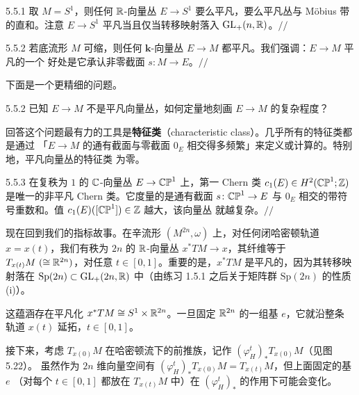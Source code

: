 \begin{wexam}{5.5.1}
  取 $M=S^1$，则任何 $\mathbb{R}$-向量丛 $E\to S^1$ 要么平凡，要么平凡丛与 Möbius 带的直和。注意
  $E\to S^1$ 平凡当且仅当转移映射落入 $\mathrm{GL}_+(n,\mathbb{R})$。\hfill$//$
\end{wexam}

\begin{wexam}{5.5.2}
  若底流形 $M$ 可缩，则任何 $\mathbf{k}$-向量丛 $E\to M$ 都平凡。我们强调：$E\to M$ 平凡的一个
  好处是它承认非零截面 $s\colon M\to E$。\hfill$//$
\end{wexam}

下面是一个更精细的问题。

\begin{wque}{5.5.2}
  已知 $E\to M$ 不是平凡向量丛，如何定量地刻画 $E\to M$ 的复杂程度？
\end{wque}

回答这个问题最有力的工具是\textbf{特征类}（characteristic class）。几乎所有的特征类都是通过
「$E\to M$ 的通有截面与零截面 $0_E$ 相交得多频繁」来定义或计算的。特别地，平凡向量丛的特征类
为零。

\begin{wexam}{5.5.3}
  在复秩为 $1$ 的 $\mathbb{C}$-向量丛 $E\to\mathbb{CP}^1$ 上，第一 Chern 类
  $c_1(E)\in H^2(\mathbb{CP}^1;\mathbb{Z})$ 是唯一的非平凡 Chern 类。它度量的是通有截面
  $s\colon\mathbb{CP}^1\to E$ 与 $0_E$ 相交的带符号重数和。值 $c_1(E)([\mathbb{CP}^1])\in\mathbb{Z}$ 越大，该向量丛
  就越复杂。\hfill$//$
\end{wexam}

现在回到我们的指标故事。在辛流形 $(M^{2n},\omega)$ 上，对任何闭哈密顿轨道 $x=x(t)$，我们有秩为
$2n$ 的 $\mathbb{R}$-向量丛 $x^*TM\to x$，其纤维等于 $T_{x(t)}M\ (\cong\mathbb{R}^{2n})$，对任意
$t\in[0,1]$。重要的是，$x^*TM$ 是平凡的，因为其转移映射落在
$\mathrm{Sp}(2n)\subset\mathrm{GL}_+(2n,\mathbb{R})$ 中（由练习 1.5.1 之后关于矩阵群
$\mathrm{Sp}(2n)$ 的性质 (i)）。

这蕴涵存在平凡化 $x^*TM\cong S^1\times\mathbb{R}^{2n}$。一旦固定 $\mathbb{R}^{2n}$ 的一组基 $e$，它就沿整条
轨道 $x(t)$ 延拓，$t\in[0,1]$。

接下来，考虑 $T_{x(0)}M$ 在哈密顿流下的前推族，记作 $(\varphi_H^t)_*T_{x(0)}M$（见图 5.22）。
虽然作为 $2n$ 维向量空间有 $(\varphi_H^t)_*T_{x(0)}M=T_{x(t)}M$，但上面固定的基 $e$
（对每个 $t\in[0,1]$ 都放在 $T_{x(t)}M$ 中）在 $(\varphi_H^t)_*$ 的作用下可能会变化。

